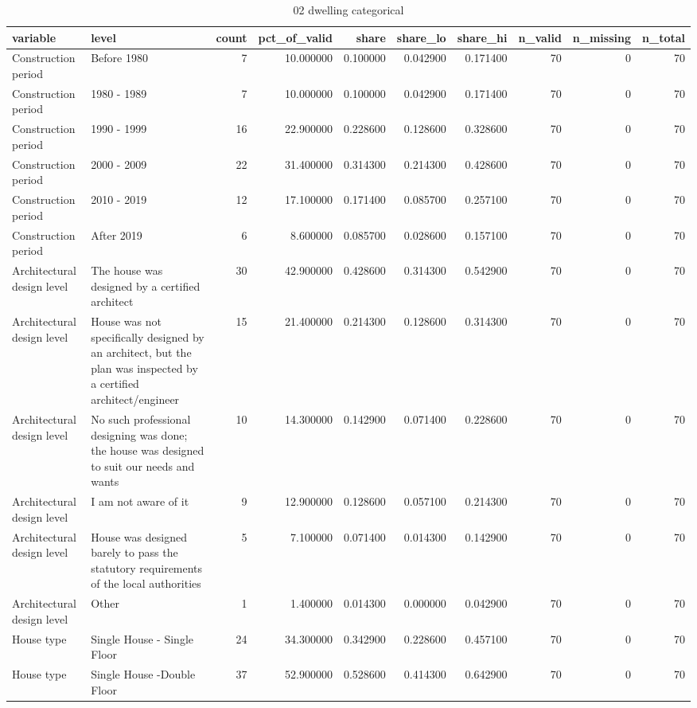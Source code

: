 \begin{table}
\caption{02 dwelling categorical}
\label{tab:02_dwelling_categorical}
\begin{tabular}{llrrrrrrrr}
\toprule
variable & level & count & pct\_of\_valid & share & share\_lo & share\_hi & n\_valid & n\_missing & n\_total \\
\midrule
Construction period & Before 1980 & 7 & 10.000000 & 0.100000 & 0.042900 & 0.171400 & 70 & 0 & 70 \\
Construction period & 1980 - 1989 & 7 & 10.000000 & 0.100000 & 0.042900 & 0.171400 & 70 & 0 & 70 \\
Construction period & 1990 - 1999 & 16 & 22.900000 & 0.228600 & 0.128600 & 0.328600 & 70 & 0 & 70 \\
Construction period & 2000 - 2009 & 22 & 31.400000 & 0.314300 & 0.214300 & 0.428600 & 70 & 0 & 70 \\
Construction period & 2010 - 2019 & 12 & 17.100000 & 0.171400 & 0.085700 & 0.257100 & 70 & 0 & 70 \\
Construction period & After 2019 & 6 & 8.600000 & 0.085700 & 0.028600 & 0.157100 & 70 & 0 & 70 \\
Architectural design level & The house was designed by a certified architect & 30 & 42.900000 & 0.428600 & 0.314300 & 0.542900 & 70 & 0 & 70 \\
Architectural design level & House was not specifically designed by an architect, but the plan was inspected by a certified architect/engineer & 15 & 21.400000 & 0.214300 & 0.128600 & 0.314300 & 70 & 0 & 70 \\
Architectural design level & No such professional designing was done; the house was designed to suit our needs and wants & 10 & 14.300000 & 0.142900 & 0.071400 & 0.228600 & 70 & 0 & 70 \\
Architectural design level & I am not aware of it & 9 & 12.900000 & 0.128600 & 0.057100 & 0.214300 & 70 & 0 & 70 \\
Architectural design level & House was designed barely to pass the statutory requirements of the local authorities & 5 & 7.100000 & 0.071400 & 0.014300 & 0.142900 & 70 & 0 & 70 \\
Architectural design level & Other & 1 & 1.400000 & 0.014300 & 0.000000 & 0.042900 & 70 & 0 & 70 \\
House type & Single House - Single Floor & 24 & 34.300000 & 0.342900 & 0.228600 & 0.457100 & 70 & 0 & 70 \\
House type & Single House -Double Floor & 37 & 52.900000 & 0.528600 & 0.414300 & 0.642900 & 70 & 0 & 70 \\

\end{tabular}
\end{table}
